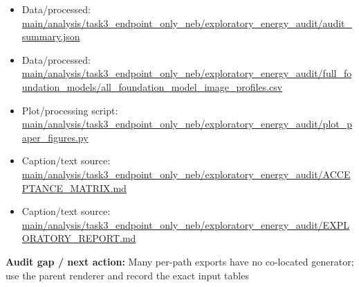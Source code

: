 \documentclass[10pt]{article}
\newcommand{\statusline}[1]{\colorbox{gray!12}{\parbox{0.96\linewidth}{#1}}}
\begin{document}
\begin{itemize}[leftmargin=1.4em,noitemsep]
\item Data/processed: \begingroup\scriptsize\url{main/analysis/task3_endpoint_only_neb/exploratory_energy_audit/audit_summary.json}\endgroup
\item Data/processed: \begingroup\scriptsize\url{main/analysis/task3_endpoint_only_neb/exploratory_energy_audit/full_foundation_models/all_foundation_model_image_profiles.csv}\endgroup
\item Plot/processing script: \begingroup\scriptsize\url{main/analysis/task3_endpoint_only_neb/exploratory_energy_audit/plot_paper_figures.py}\endgroup
\item Caption/text source: \begingroup\scriptsize\url{main/analysis/task3_endpoint_only_neb/exploratory_energy_audit/ACCEPTANCE_MATRIX.md}\endgroup
\item Caption/text source: \begingroup\scriptsize\url{main/analysis/task3_endpoint_only_neb/exploratory_energy_audit/EXPLORATORY_REPORT.md}\endgroup
\end{itemize}
\statusline{\textbf{Audit gap / next action:} Many per-path exports have no co-located generator; use the parent renderer and record the exact input tables}
\vfill
\clearpage
\end{document}
